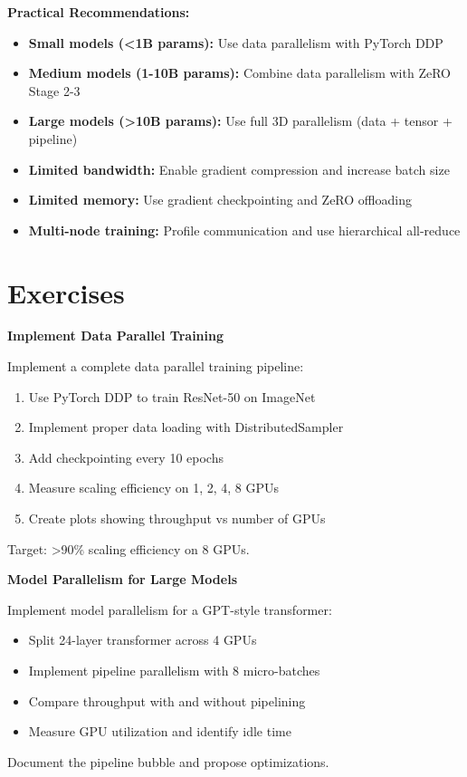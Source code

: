 \textbf{Practical Recommendations:}

\begin{itemize}
    \item \textbf{Small models (<1B params):} Use data parallelism with PyTorch DDP
    \item \textbf{Medium models (1-10B params):} Combine data parallelism with ZeRO Stage 2-3
    \item \textbf{Large models (>10B params):} Use full 3D parallelism (data + tensor + pipeline)
    \item \textbf{Limited bandwidth:} Enable gradient compression and increase batch size
    \item \textbf{Limited memory:} Use gradient checkpointing and ZeRO offloading
    \item \textbf{Multi-node training:} Profile communication and use hierarchical all-reduce
\end{itemize}

\section{Exercises}

\begin{exercise}
\textbf{Implement Data Parallel Training}

Implement a complete data parallel training pipeline:
\begin{enumerate}
    \item Use PyTorch DDP to train ResNet-50 on ImageNet
    \item Implement proper data loading with DistributedSampler
    \item Add checkpointing every 10 epochs
    \item Measure scaling efficiency on 1, 2, 4, 8 GPUs
    \item Create plots showing throughput vs number of GPUs
\end{enumerate}

Target: >90\% scaling efficiency on 8 GPUs.
\end{exercise}

\begin{exercise}
\textbf{Model Parallelism for Large Models}

Implement model parallelism for a GPT-style transformer:
\begin{itemize}
    \item Split 24-layer transformer across 4 GPUs
    \item Implement pipeline parallelism with 8 micro-batches
    \item Compare throughput with and without pipelining
    \item Measure GPU utilization and identify idle time
\end{itemize}

Document the pipeline bubble and propose optimizations.
\end{exercise}

